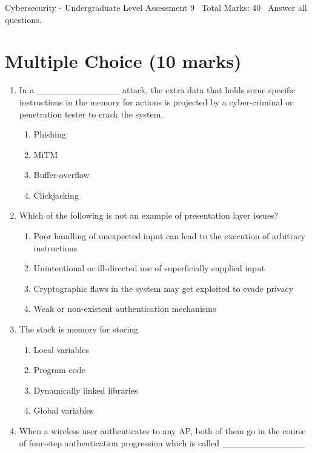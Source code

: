 \documentclass[12pt]{article}
\begin{document}
\begin{center}
Cybersecurity - Undergraduate Level Assessment 9 \
Total Marks: 40 \
Answer all questions.
\end{center}

\section*{Multiple Choice (10 marks)}
\begin{enumerate}[label=\arabic*.]
\item In a \_\_\_\_\_\_\_\_\_\_\_\_\_ attack, the extra data that holds some specific instructions in the memory for actions is projected by a cyber-criminal or penetration tester to crack the system.
\begin{enumerate}[label=(\alph*)]
    \item Phishing
    \item MiTM
    \item Buffer-overflow
    \item Clickjacking
\end{enumerate}
\item Which of the following is not an example of presentation layer issues?
\begin{enumerate}[label=(\alph*)]
    \item Poor handling of unexpected input can lead to the execution of arbitrary instructions
    \item Unintentional or ill-directed use of superficially supplied input
    \item Cryptographic flaws in the system may get exploited to evade privacy
    \item Weak or non-existent authentication mechanisms
\end{enumerate}
\item The stack is memory for storing
\begin{enumerate}[label=(\alph*)]
    \item Local variables
    \item Program code
    \item Dynamically linked libraries
    \item Global variables
\end{enumerate}
\item When a wireless user authenticates to any AP, both of them go in the course of four-step authentication progression which is called \_\_\_\_\_\_\_\_\_\_\_\_\_
\begin{enumerate}[label=(\alph*)]

\end{enumerate}
\end{enumerate}
\end{document}
